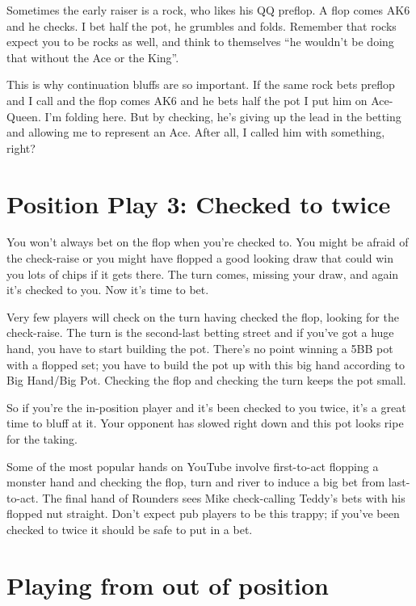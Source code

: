 Sometimes the early raiser is a rock, who likes his QQ preflop.
A flop comes AK6 and he checks. I bet half the pot, he grumbles and
folds. Remember that rocks expect you to be rocks as well, and think
to themselves ``he wouldn't be doing that without the Ace or the King''.

This is why continuation bluffs are so important. If the same rock bets
preflop and I call and the flop comes AK6 and he bets half the pot
I put him on Ace-Queen. I'm folding here. But by checking, he's giving
up the lead in the betting and allowing me to represent an Ace. After
all, I called him with something, right?

\section{Position Play 3: Checked to twice}

You won't always bet on the flop when you're checked to. You might
be afraid of the check-raise or you might have flopped a good looking
draw that could win you lots of chips if it gets there. The turn comes,
missing your draw, and again it's checked to you. Now it's time to bet.

Very few players will check on the turn having checked the flop,
looking for the check-raise. The turn is the second-last betting
street and if you've got a huge hand, you have to start building the pot.
There's no point winning a 5BB pot with a flopped set; you have to
build the pot up with this big hand according to Big Hand/Big Pot.
Checking the flop and checking the turn keeps the pot small.

So if you're the in-position player and it's been checked to you twice,
it's a great time to bluff at it. Your opponent has slowed right down
and this pot looks ripe for the taking.

Some of the most popular hands on YouTube involve first-to-act
flopping a monster hand and checking the flop, turn and river to
induce a big bet from last-to-act. The final hand of Rounders sees
Mike check-calling Teddy's bets with his flopped nut straight. Don't
expect pub players to be this trappy; if you've been checked to twice
it should be safe to put in a bet.


\section{Playing from out of position}

